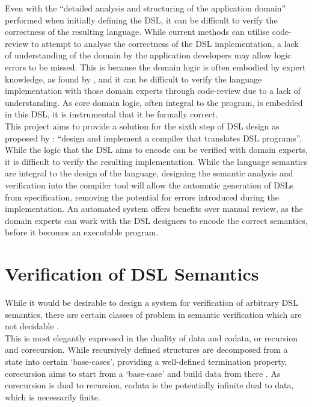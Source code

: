 \documentclass[a4paper,11pt]{report}
\begin{document}
Even with the ``detailed analysis and structuring of the application domain'' \citep{van2000domain} performed when initially defining the DSL, it can be difficult to verify the correctness of the resulting language. 
While current methods can utilise code-review to attempt to analyse the correctness of the DSL implementation, a lack of understanding of the domain by the application developers may allow logic errors to be missed. 
This is because the domain logic is often embodied by expert knowledge, as found by \cite{studer1998knowledge}, and it can be difficult to verify the language implementation with those domain experts through code-review due to a lack of understanding.
As core domain logic, often integral to the program, is embedded in this DSL, it is instrumental that it be formally correct.\\

This project aims to provide a solution for the sixth step of DSL design as proposed by \cite{van2000domain}: ``design and implement a compiler that translates DSL programs''. 
While the logic that the DSL aims to encode can be verified with domain experts, it is difficult to verify the resulting implementation.
While the language semantics are integral to the design of the language, designing the semantic analysis and verification into the compiler tool will allow the automatic generation of DSLs from specification, removing the potential for errors introduced during the implementation.
An automated system offers benefits over manual review, as the domain experts can work with the DSL designers to encode the correct semantics, before it becomes an executable program.


\section{Verification of DSL Semantics} %
\label{sec:verification_of_dsl_semantics}
While it would be desirable to design a system for verification of arbitrary DSL semantics, there are certain classes of problem in semantic verification which are not decidable \citep{abdulla1994undecidable}. \\

This is most elegantly expressed in the duality of data and codata, or recursion and corecursion. 
While recursively defined structures are decomposed from a state into certain `base-cases', providing a well-defined termination property, corecursion aims to start from a `base-case' and build data from there \citep{hinze2010reasoning}.
As corecursion is dual to recursion, codata is the potentially infinite dual to data, which is necessarily finite. \\
\end{document}
